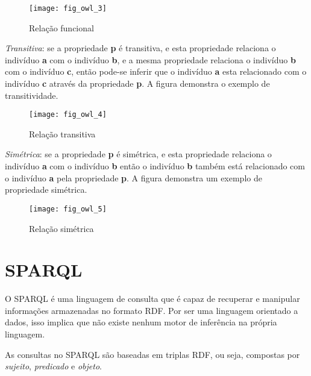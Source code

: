 \begin{itemize}
    \begin{figure}[!h]
      \centering
      \texttt{[image: fig\_owl\_3]}
      \caption{Relação funcional}
      \label{fig:fig_owl_3}
    \end{figure}

    \vskip 0.6cm

    \textit{Transitiva}: se a propriedade \textbf{p} é transitiva, e esta
    propriedade relaciona o indivíduo \textbf{a} com o indivíduo \textbf{b}, e a
    mesma propriedade relaciona o indivíduo \textbf{b} com o indivíduo \textbf{c},
    então pode-se inferir que o indivíduo \textbf{a} esta relacionado com o
    indivíduo \textbf{c} através da propriedade \textbf{p}. A figura demonstra
    o exemplo de transitividade.

    \begin{figure}[!h]
      \centering
      \texttt{[image: fig\_owl\_4]}
      \caption{Relação transitiva}
      \label{fig:fig_owl_4}
    \end{figure}

    \vskip 0.6cm

    \textit{Simétrica}: se a propriedade \textbf{p} é simétrica, e esta
    propriedade relaciona o indivíduo \textbf{a} com o indivíduo \textbf{b} então
    o indivíduo \textbf{b} também está relacionado com o indivíduo \textbf{a} pela
    propriedade \textbf{p}. A figura demonstra um exemplo de propriedade simétrica.

    \begin{figure}[!h]
      \centering
      \texttt{[image: fig\_owl\_5]}
      \caption{Relação simétrica}
      \label{fig:fig_owl_5}
    \end{figure}

    \vskip 0.6cm
\end{itemize}

\section{SPARQL}
\label{sec:sparql}

O SPARQL é uma linguagem de consulta que é capaz de recuperar e manipular
informações armazenadas no formato RDF. Por ser uma linguagem orientado a dados,
isso implica que não existe nenhum motor de inferência na própria linguagem.

As consultas no SPARQL são baseadas em triplas RDF, ou seja, compostas por
\textit{sujeito}, \textit{predicado} e \textit{objeto}.

